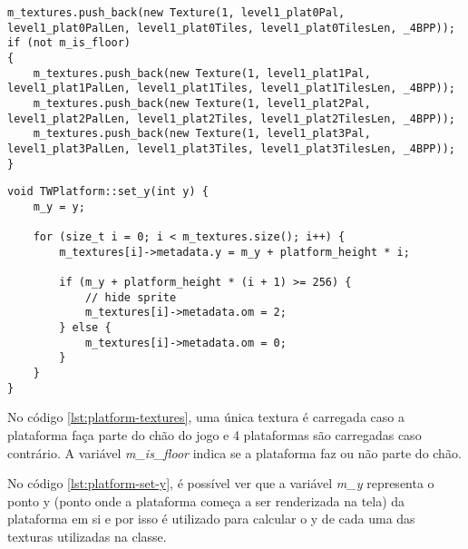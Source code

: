 \begin{lstlisting}[caption={\textit{std::vector} com as texturas das plataformas sendo preenchido.},label={lst:platform-textures}]
m_textures.push_back(new Texture(1, level1_plat0Pal, level1_plat0PalLen, level1_plat0Tiles, level1_plat0TilesLen, _4BPP));
if (not m_is_floor)
{
    m_textures.push_back(new Texture(1, level1_plat1Pal, level1_plat1PalLen, level1_plat1Tiles, level1_plat1TilesLen, _4BPP));
    m_textures.push_back(new Texture(1, level1_plat2Pal, level1_plat2PalLen, level1_plat2Tiles, level1_plat2TilesLen, _4BPP));
    m_textures.push_back(new Texture(1, level1_plat3Pal, level1_plat3PalLen, level1_plat3Tiles, level1_plat3TilesLen, _4BPP));
}
\end{lstlisting}

\begin{lstlisting}[caption={Método responsável por calcular as alturas das texturas utilizadas nas plataformas},label={lst:platform-set-y}]
void TWPlatform::set_y(int y) {
    m_y = y;

    for (size_t i = 0; i < m_textures.size(); i++) {
        m_textures[i]->metadata.y = m_y + platform_height * i;

        if (m_y + platform_height * (i + 1) >= 256) {
            // hide sprite
            m_textures[i]->metadata.om = 2;
        } else {
            m_textures[i]->metadata.om = 0;
        }
    }
}
\end{lstlisting}

No código \ref{lst:platform-textures}, uma única textura é carregada caso a plataforma faça parte do chão do jogo e 4 plataformas são carregadas caso contrário. A variável \textit{m\_is\_floor} indica se a plataforma faz ou não parte do chão. 

No código \ref{lst:platform-set-y}, é possível ver que a variável \textit{m\_y} representa o ponto y (ponto onde a plataforma começa a ser renderizada na tela) da plataforma em si e por isso é utilizado para calcular o y de cada uma das texturas utilizadas na classe.

